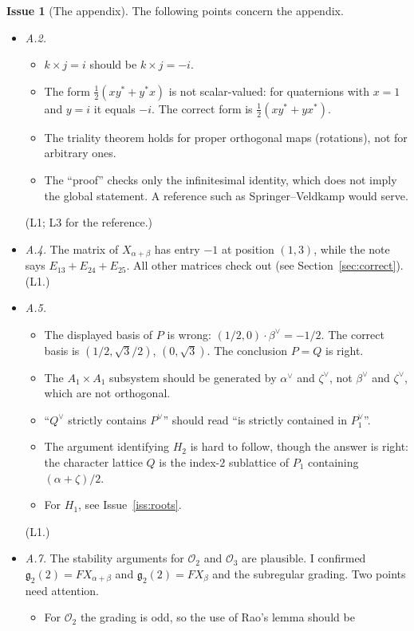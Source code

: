 \documentclass[12pt,letterpaper]{article}
\newcommand{\cO}{\mathcal{O}}
\newcommand{\Lv}[1]{\textsf{L#1}}
\theoremstyle{definition}
\newtheorem{issue}{Issue}[section]
\begin{document}
\begin{issue}[The appendix]\label{iss:app}
The following points concern the appendix.
\begin{itemize}
\item \emph{A.2.}
\begin{itemize}
\item $k\times j=i$ should be $k\times j=-i$.
\item The form $\tfrac12(xy^*+y^*x)$ is not scalar-valued: for quaternions with
$x=1$ and $y=i$ it equals $-i$. The correct form is $\tfrac12(xy^*+yx^*)$.
\item The triality theorem holds for proper orthogonal maps (rotations), not
for arbitrary ones.
\item The ``proof'' checks only the infinitesimal identity, which does not
imply the global statement. A reference such as Springer--Veldkamp would
serve.
\end{itemize}
(\Lv{1}; \Lv{3} for the reference.)
\item \emph{A.4.} The matrix of $X_{\alpha+\beta}$ has entry $-1$ at position
$(1,3)$, while the note says $E_{13}+E_{24}+E_{25}$. All other matrices check
out (see Section~\ref{sec:correct}). (\Lv{1}.)
\item \emph{A.5.}
\begin{itemize}
\item The displayed basis of $P$ is wrong: $(1/2,0)\cdot\beta^\vee=-1/2$. The
correct basis is $(1/2,\sqrt3/2)$, $(0,\sqrt3)$. The conclusion $P=Q$ is right.
\item The $A_1\times A_1$ subsystem should be generated by $\alpha^\vee$ and
$\zeta^\vee$, not $\beta^\vee$ and $\zeta^\vee$, which are not orthogonal.
\item ``$Q^\vee$ strictly contains $P^\vee$'' should read ``is strictly
contained in $P_1^\vee$''.
\item The argument identifying $H_2$ is hard to follow, though the answer is
right: the character lattice $Q$ is the index-$2$ sublattice of $P_1$
containing $(\alpha+\zeta)/2$.
\item For $H_1$, see Issue~\ref{iss:roots}.
\end{itemize}
(\Lv{1}.)
\item \emph{A.7.} The stability arguments for $\cO_2$ and $\cO_3$ are
plausible. I confirmed $\mathfrak g_2(2)=F X_{\alpha+\beta}$ and
$\mathfrak g_2(2)=F X_\beta$ and the subregular grading. Two points need
attention.
\begin{itemize}
\item For $\cO_2$ the grading is odd, so the use of Rao's lemma should be

\end{itemize}
\end{itemize}
\end{issue}
\end{document}
